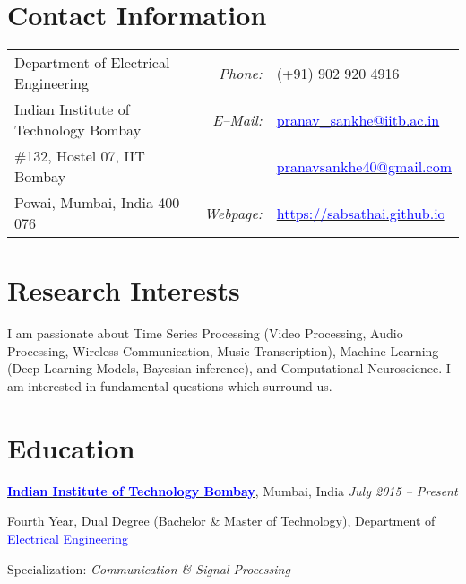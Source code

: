 \documentclass[margin,line, 9pt]{res}
\newenvironment{list1}{
  \begin{list}{\ding{113}}{%
      \setlength{\itemsep}{0in}
      \setlength{\parsep}{0in} \setlength{\parskip}{0in}
      \setlength{\topsep}{0in} \setlength{\partopsep}{0in} 
      \setlength{\leftmargin}{0.17in}}}{\end{list}}
\begin{document}

\begin{resume}
\section{\sc Contact Information}
\vspace{.05in}
\begin{tabular}{@{}p{2.9in}p{.5in}p{3in}}
Department of Electrical Engineering & \multicolumn{1}{r}{\it Phone:}  &(+91) 902 920 4916 \\            
Indian Institute of Technology Bombay &\multicolumn{1}{r}{\it E--Mail:}& \href{mailto:pranav_sankhe@iitb.ac.in}{\textcolor{blue}{pranav\_sankhe@iitb.ac.in}} \\ 
\#132, Hostel 07, IIT Bombay & & \href{mailto:pranavsankhe40@gmail.com}{\textcolor{blue}{pranavsankhe40@gmail.com}} \\ 
Powai, Mumbai, India 400 076 & \multicolumn{1}{r}{\it Webpage:} &\href{https://sabsathai.github.io}{\textcolor{blue}{https://sabsathai.github.io}} \\     
\end{tabular}

\section{\sc Research Interests}
I am passionate about Time Series Processing (Video Processing, Audio Processing, Wireless Communication, Music Transcription), Machine Learning (Deep Learning Models, Bayesian inference), and Computational Neuroscience. I am interested in fundamental questions which surround us.

\section{\sc Education}
{\bf \href{http://www.iitb.ac.in/}{\textcolor{blue}{Indian Institute of Technology Bombay}}}, Mumbai, India \hfill {\it July 2015 -- Present} \\
\vspace*{-.13in}
\begin{list1}
\item[] Fourth Year, Dual Degree (Bachelor \& Master of Technology), Department of \href{http://www.ee.iitb.ac.in/}{\textcolor{blue}{Electrical Engineering}}
\item[] Specialization: {\em Communication \& Signal Processing}
\end{list1}


\end{resume}
\end{document}
